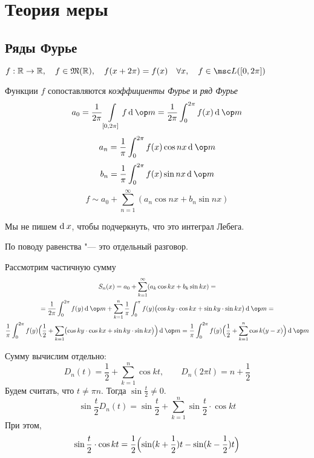 \chapter{Теория меры}

\section{Ряды Фурье}

\begin{definition}
	$ f : \R \to \R, \quad f \in \mathfrak M(\R), \quad f(x + 2\pi) = f(x) \quad \forall x, \quad f \in \msc L([0, 2\pi]) $

	Функции $ f $ сопоставляются \emph{коэффициенты Фурье} и \emph{ряд Фурье}
	$$ a_0 = \frac1{2\pi} \int\limits_{[0, 2\pi]} f \di \op m = \frac1{2\pi} \int_0^{2\pi} f(x) \di \op m $$
	$$ a_n = \frac1\pi \int_0^{2\pi} f(x) \cos n x \di \op m $$
	$$ b_n = \frac1\pi \int_0^{2\pi} f(x) \sin nx \di \op m $$
	$$ f \sim a_0 + \sum_{n = 1}^\infty (a_n \cos nx + b_n \sin nx) $$
\end{definition}

\begin{note}
	Мы не пишем $ \operatorname{d}^{} x $, чтобы подчеркнуть, что это интеграл Лебега.
\end{note}

\begin{note}
	По поводу равенства "--- это отдельный разговор.
\end{note}

Рассмотрим частичную сумму
\begin{multline*}
	S_n(x) = a_0 + \sum_{k = 1}^\infty (a_k \cos kx + b_k \sin kx) = \\
	= \frac1{2\pi} \int_0^{2\pi} f(y) \di \op m + \sum_{k = 1}^n \frac1\pi \int_0^\pi f(y) \bigl( \cos ky \cdot \cos kx + \sin ky \cdot \sin kx \bigr) \di \op m = \\
	\frac1\pi \int_0^{2\pi} f(y) \Bigl( \frac12 + \sum_{k = 1} \bigl( \cos ky \cdot \cos kx + \sin ky \cdot \sin kx \bigr) \Bigr) \di \op m =
	\frac1\pi \int_0^{2\pi} f(y) \Bigl( \frac12 + \sum_{k = 1}^n \cos k(y - x) \Bigr) \di \op m
\end{multline*}

Сумму вычислим отдельно:
$$ D_n(t) = \frac12 + \sum_{k = 1}^n \cos kt, \qquad D_n(2\pi l) = n + \frac12 $$
Будем считать, что $ t \ne \pi n $. Тогда $ \sin \frac t2 \ne 0 $.
$$ \sin \frac t2 D_n(t) = \sin \frac t2 + \sum_{k = 1}^n \sin \frac t2 \cdot \cos kt $$
При этом,
$$ \sin \frac t2 \cdot \cos kt = \frac12 \Bigl( \sin (k + \frac12) t - \sin (k - \frac12) t \Bigr) $$

